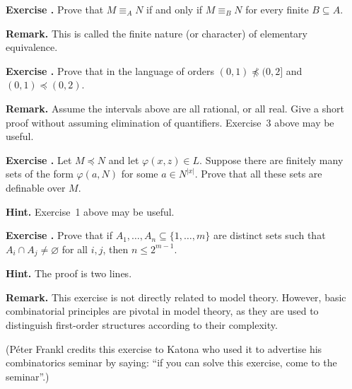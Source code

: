 \documentclass[10pt]{article}
\def\phi{\varphi}
\def\0{\varnothing}
\newcounter{ex}
\newenvironment{exercise}{\par\bigskip\addtocounter{ex}{1}\textbf{Exercise \theex.\quad}}{}
\newenvironment{hint}{\par\smallskip\color{blue}\textbf{Hint.\quad}}{}
\newenvironment{remark}{\par\smallskip\color{blue}\textbf{Remark.\quad}}{}
\begin{document}
\begin{exercise}\label{ex_finite_nature}
Prove that $M\equiv_AN$ if and only if $M\equiv_BN$ for every finite $B\subseteq A$.
\begin{remark}
This is called the finite nature (or character) of elementary equivalence.
\end{remark}
\end{exercise}


\begin{exercise}
Prove that in the language of orders $(0,1)\not\preceq(0,2]$ and $(0,1)\preceq(0,2)$.
\begin{remark}
Assume the intervals above are all rational, or all real. Give a short proof without assuming elimination of quantifiers. Exercise~3 above may be useful.
\end{remark}
\end{exercise}

\begin{exercise}
Let $M\preceq N$ and let $\phi(x,z)\in L$. Suppose there are finitely many sets of the form $\phi(a,N)$ for some $a\in N^{|x|}$. Prove that all these sets are definable over $M$.
\begin{hint}
Exercise~1 above may be useful.
\end{hint}
\end{exercise}

\begin{exercise}
Prove that if $A_1,\dots,A_n\subseteq\big\{1,\dots,m\big\}$ are distinct sets such that $A_i\cap A_j\neq\0$ for all $i, j$, then $n\le 2^{m-1}$.
\begin{hint}
The proof is two lines.
\end{hint}
\begin{remark}
This exercise is not directly related to model theory. However, basic combinatorial principles are pivotal in model theory, as they are used to distinguish first-order structures according to their complexity.

(P\'eter Frankl credits this exercise to Katona who used it to advertise his combinatorics seminar by saying: ``if you can solve this exercise, come to the seminar''.)
\end{remark}
\end{exercise}
\end{document}
